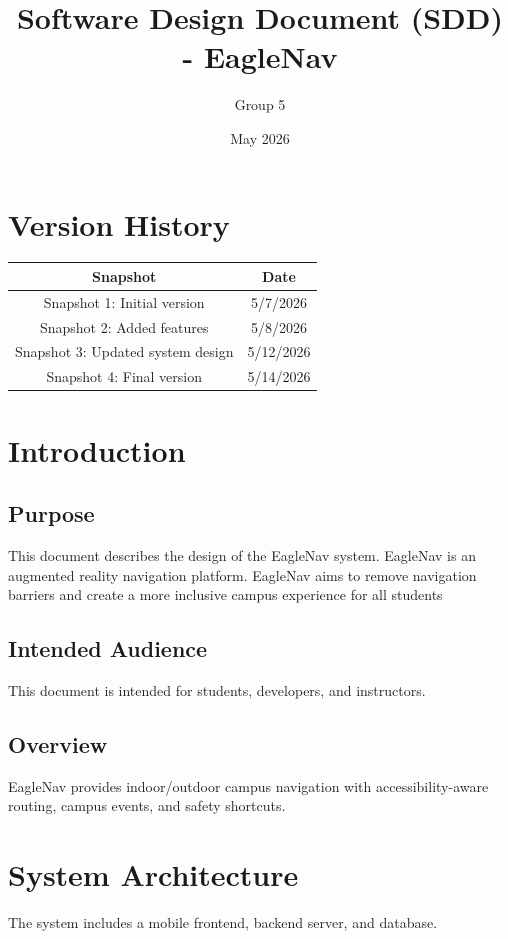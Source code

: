 \documentclass{article}
\title{Software Design Document (SDD) - EagleNav}
\author{Group 5}
\date{May 2026}
\begin{document}
\maketitle
\clearpage

\tableofcontents
\newpage

\section{Version History}
\begin{table}[h!]
	\begin{tabular}{|c|c|}
		\hline
		\textbf{Snapshot} & \textbf{Date} \\
		\hline
		Snapshot 1: Initial version & 5/7/2026 \\
		Snapshot 2: Added features & 5/8/2026 \\
		Snapshot 3: Updated system design & 5/12/2026 \\
		Snapshot 4: Final version & 5/14/2026 \\
		\hline
	\end{tabular}
\end{table}

\section{Introduction}
\subsection{Purpose}
This document describes the design of the EagleNav system.
EagleNav is an augmented reality navigation platform. EagleNav aims to remove navigation barriers and create a more inclusive campus experience for all students 


\subsection{Intended Audience}
This document is intended for students, developers, and instructors.

\subsection{Overview}
EagleNav provides indoor/outdoor campus navigation with accessibility-aware
routing, campus events, and safety shortcuts. 

\newpage
\section{System Architecture}
The system includes a mobile frontend, backend server, and database.
\end{document}
